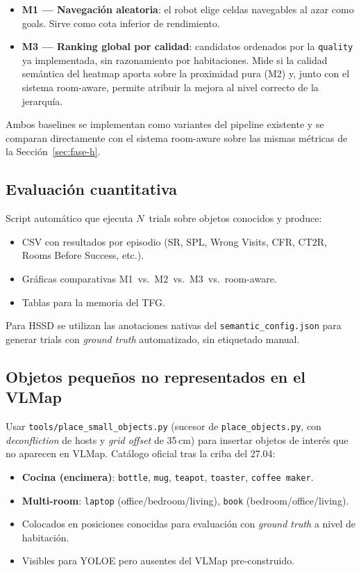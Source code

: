 \documentclass[11pt,a4paper]{article}
\begin{document}
\begin{itemize}
  \item \textbf{M1 --- Navegación aleatoria}: el robot elige celdas
        navegables al azar como goals. Sirve como cota inferior de
        rendimiento.
  \item \textbf{M3 --- Ranking global por calidad}: candidatos ordenados por
        la \texttt{quality} ya implementada, sin razonamiento por
        habitaciones. Mide si la calidad semántica del heatmap aporta sobre
        la proximidad pura (M2) y, junto con el sistema room-aware, permite
        atribuir la mejora al nivel correcto de la jerarquía.
\end{itemize}

Ambos baselines se implementan como variantes del pipeline existente y se
comparan directamente con el sistema room-aware sobre las mismas métricas
de la Sección~\ref{sec:fase-h}.

\subsection{Evaluación cuantitativa}

Script automático que ejecuta $N$~trials sobre objetos conocidos y produce:

\begin{itemize}
  \item CSV con resultados por episodio (SR, SPL, Wrong Visits, CFR, CT2R,
        Rooms Before Success, etc.).
  \item Gráficas comparativas M1~vs.\ M2~vs.\ M3~vs.\ room-aware.
  \item Tablas para la memoria del TFG.
\end{itemize}

Para HSSD se utilizan las anotaciones nativas del
\texttt{semantic\_config.json} para generar trials con \emph{ground truth}
automatizado, sin etiquetado manual.

\subsection{Objetos pequeños no representados en el VLMap}

Usar \texttt{tools/place\_small\_objects.py} (sucesor de
\texttt{place\_objects.py}, con \emph{deconfliction} de hosts y
\emph{grid offset} de 35\,cm) para insertar objetos de interés que no
aparecen en VLMap. Catálogo oficial tras la criba del 27.04:

\begin{itemize}
  \item \textbf{Cocina (encimera)}: \texttt{bottle}, \texttt{mug},
        \texttt{teapot}, \texttt{toaster}, \texttt{coffee maker}.
  \item \textbf{Multi-room}: \texttt{laptop} (office/bedroom/living),
        \texttt{book} (bedroom/office/living).
  \item Colocados en posiciones conocidas para evaluación con
        \emph{ground truth} a nivel de habitación.
  \item Visibles para YOLOE pero ausentes del VLMap pre-construido.
\end{itemize}
\end{document}
